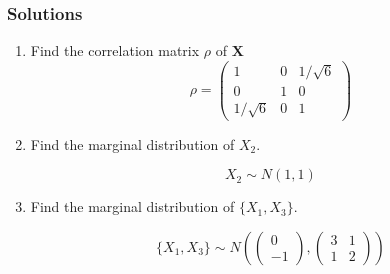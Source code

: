 \documentclass{beamer}
\begin{document}
\begin{frame}
\frametitle{Solutions}
\begin{enumerate}
\item Find the correlation matrix $\rho$ of $\mathbf{X}$
$$\rho = \begin{pmatrix}
1 & 0 & 1/\sqrt{6}\\
0 & 1 & 0\\
1/\sqrt{6} & 0 & 1
\end{pmatrix}$$

\item Find the marginal distribution of $X_2$.

$$ X_2 \sim N(1, 1)$$
\item Find the marginal distribution of $\{X_1, X_3\}$.

$$\{X_1, X_3\} \sim N\left(\begin{pmatrix} 0 \\ -1 \end{pmatrix} , \begin{pmatrix} 3 & 1 \\ 1 & 2 \end{pmatrix}\right)$$
\end{enumerate}
\end{frame}
\end{document}
